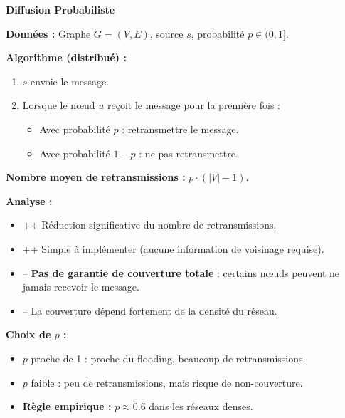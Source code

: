 \documentclass[12pt,a4paper]{article}
\begin{document}
\begin{algorithme}
\textbf{Diffusion Probabiliste}

\textbf{Données :} Graphe $G = (V, E)$, source $s$, probabilité $p \in (0, 1]$.

\textbf{Algorithme (distribué) :}
\begin{enumerate}
    \item $s$ envoie le message.
    \item Lorsque le nœud $u$ reçoit le message pour la première fois :
    \begin{itemize}
        \item Avec probabilité $p$ : retransmettre le message.
        \item Avec probabilité $1 - p$ : ne pas retransmettre.
    \end{itemize}
\end{enumerate}

\textbf{Nombre moyen de retransmissions :} $p \cdot (|V| - 1)$.
\end{algorithme}

\begin{important}
\textbf{Analyse :}

\begin{itemize}
    \item \textcolor{defvert}{++} Réduction significative du nombre de retransmissions.
    \item \textcolor{defvert}{++} Simple à implémenter (aucune information de voisinage requise).
    \item \textcolor{importantrouge}{--} \textbf{Pas de garantie de couverture totale} : certains
          nœuds peuvent ne jamais recevoir le message.
    \item \textcolor{importantrouge}{--} La couverture dépend fortement de la densité du réseau.
\end{itemize}

\textbf{Choix de $p$ :}
\begin{itemize}
    \item $p$ proche de 1 : proche du flooding, beaucoup de retransmissions.
    \item $p$ faible : peu de retransmissions, mais risque de non-couverture.
    \item \textbf{Règle empirique :} $p \approx 0.6$ dans les réseaux denses.
\end{itemize}
\end{important}
\end{document}
